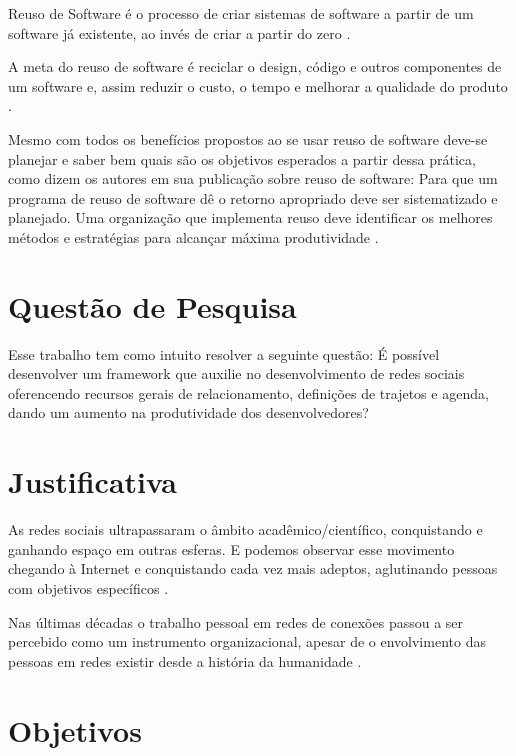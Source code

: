 Reuso de Software é o processo de criar sistemas de software a partir de um software já existente, ao invés de criar a partir do zero \cite{Krueger:1992}.

A meta do reuso de software é reciclar o design, código e outros componentes de um software e, assim reduzir o custo, o tempo e melhorar a qualidade do produto \cite{Keswani:Joshi:Jatain:2014}.

Mesmo com todos os benefícios propostos ao se usar reuso de software deve-se planejar e saber bem quais são os objetivos esperados a partir dessa prática, como dizem os autores em sua publicação sobre reuso de software: Para que um programa de reuso de software dê o retorno apropriado deve ser sistematizado e planejado. Uma organização que implementa reuso deve identificar os melhores métodos e estratégias para alcançar máxima produtividade \cite{Keswani:Joshi:Jatain:2014}.

\section*{Questão de Pesquisa}

Esse trabalho tem como intuito resolver a seguinte questão: É possível desenvolver um framework que auxilie no desenvolvimento de redes sociais oferencendo recursos gerais de relacionamento, definições de trajetos e agenda, dando um aumento na produtividade dos desenvolvedores?

\section*{Justificativa}

As redes sociais ultrapassaram o âmbito acadêmico/científico, conquistando e ganhando espaço em outras esferas. E podemos observar esse movimento chegando à Internet e conquistando cada vez mais adeptos, aglutinando pessoas com objetivos específicos \cite{Tomae:Alcara:Chiara:2005}.

Nas últimas décadas o trabalho pessoal em redes de conexões passou a ser percebido como um instrumento organizacional, apesar de o envolvimento das pessoas em redes existir desde a história da humanidade \cite{Tomae:Alcara:Chiara:2005}.

\section*{Objetivos}

